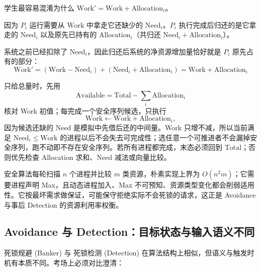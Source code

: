 \documentclass[11pt,a4paper]{ctexart}
\begin{document}
\begin{corebox}
学生最容易混淆为什么 $\text{Work}' = \text{Work} + \text{Allocation}_i$。

因为 $P_i$ 运行需要从 $\text{Work}$ 中拿走它还缺少的 $\text{Need}_i$。$P_i$ 执行完成后归还的是它拿走的 $\text{Need}_i$ 以及原先已持有的 $\text{Allocation}_i$（共归还 $\text{Need}_i + \text{Allocation}_i$）。

系统之前已经扣除了 $\text{Need}_i$，因此归还后系统的净资源增加量恰好就是 $P_i$ 原先占有的部分：
\[
\boxed{\text{Work}' = (\text{Work} - \text{Need}_i) + (\text{Need}_i + \text{Allocation}_i) = \text{Work} + \text{Allocation}_i}
\]
\end{corebox}

\begin{method}[银行家手算的三个自检不变量]
只给总量时，先用
\[
\boxed{\text{Available}=\text{Total}-\sum_i\text{Allocation}_i}
\]
核对 Work 初值；每完成一个安全序列候选，只执行
\[
\text{Work}\leftarrow\text{Work}+\text{Allocation}_i,
\]
因为候选还缺的 Need 是模拟中先借后还的中间量。Work 只增不减，所以当前满足 $\text{Need}_i\le\text{Work}$ 的进程以后不会失去可完成性；选任意一个可推进者不会漏掉安全序列，跑不动即不存在安全序列。若所有进程都完成，末态必须回到 $\text{Total}$；否则优先检查 Allocation 求和、Need 减法或向量比较。

安全算法每轮扫描 $n$ 个进程并比较 $m$ 类资源，朴素实现上界为 $O(n^2m)$；它需要进程声明 Max，且动态进程加入、Max 不可预知、资源类型变化都会削弱适用性。它按最坏需求做保证，可能保守拒绝实际不会死锁的请求，这正是 Avoidance 与事后 Detection 的资源利用率权衡。
\end{method}

\subsection{Avoidance 与 Detection：目标状态与输入语义不同}

死锁规避 (Banker) 与 死锁检测 (Detection) 在算法结构上相似，但语义与触发时机有本质不同。考场上必须对比澄清：
\end{document}
